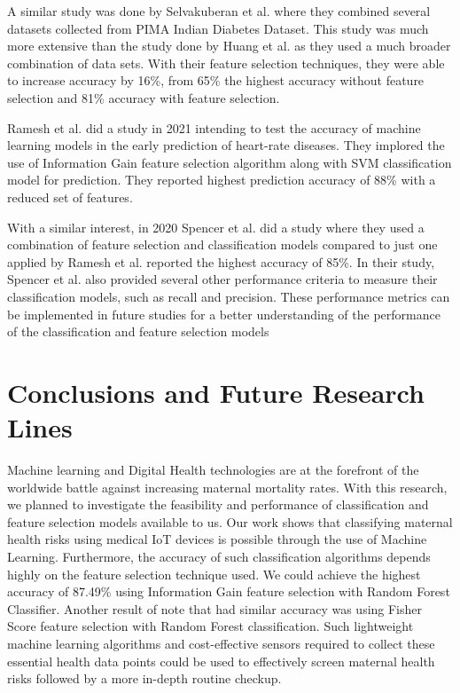 \documentclass[conference]{IEEEtran}
\begin{document}
A similar study was done by Selvakuberan et al. \cite{selvakuberan2011efficient} where they combined several datasets collected from PIMA Indian Diabetes Dataset. This study was much more extensive than the study done by Huang et al. as they used a much broader combination of data sets. With their feature selection techniques, they were able to increase accuracy by 16\%, from 65\% the highest accuracy without feature selection and 81\% accuracy with feature selection.


Ramesh et al. \cite{ramesh2021improving} did a study in 2021 intending to test the accuracy of machine learning models in the early prediction of heart-rate diseases. They implored the use of Information Gain \cite{infogain} feature selection algorithm along with SVM \cite{svm} classification model for prediction. They reported highest prediction accuracy of 88\% with a reduced set of features.


With a similar interest, in 2020 Spencer et al. \cite{spencer2020exploring} did a study where they used a combination of feature selection and classification models compared to just one applied by Ramesh et al. reported the highest accuracy of 85\%. In their study, Spencer et al. also provided several other performance criteria to measure their classification models, such as recall and precision. These performance metrics can be implemented in future studies for a better understanding of the performance of the classification and feature selection models

\section{Conclusions and Future Research Lines}
Machine learning and Digital Health technologies are at the forefront of the worldwide battle against increasing maternal mortality rates. With this research, we planned to investigate the feasibility and performance of classification and feature selection models available to us. Our work shows that
classifying maternal health risks using medical IoT devices is possible through the use of Machine Learning. Furthermore, the accuracy of such classification algorithms depends highly on the feature selection technique used. We could achieve the highest accuracy of 87.49\% using Information Gain feature selection with Random Forest Classifier. Another result of note that had similar accuracy was using Fisher Score feature selection with Random Forest classification. Such
lightweight machine learning algorithms and cost-effective sensors required to collect these essential health data points could be used to effectively screen maternal health risks followed by a more in-depth routine checkup.
\end{document}
